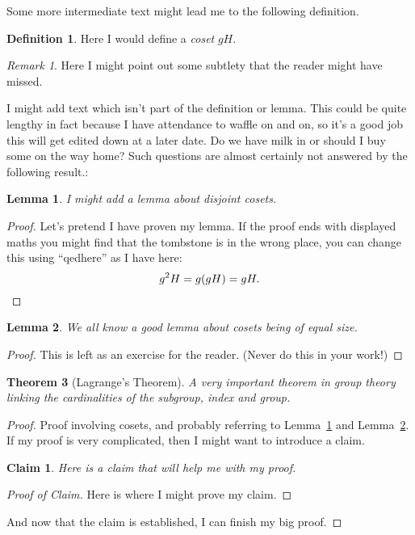 \documentclass[a4paper,11pt]{article}
\theoremstyle{plain} %
\newtheorem{thm}{Theorem}[section]
\newtheorem{lem}[thm]{Lemma}
\newtheorem*{claim}{Claim}
\theoremstyle{definition} %
\newtheorem{defn}{Definition}[section]
\theoremstyle{remark} %
\newtheorem*{rem}{Remark}
\begin{document}
Some more intermediate text might lead me to the following definition.
\begin{defn}
	Here I would define a \emph{coset} $gH$.
\end{defn}
\begin{rem}
	Here I might point out some subtlety that the reader might have missed.
\end{rem}

I might add text which isn't part of the definition or lemma. This could be quite lengthy in fact because I have attendance to waffle on and on, so it's a good job this will get edited down at a later date. Do we have milk in or should I buy some on the way home? Such questions are almost certainly not answered by the following result.:

\begin{lem}\label{lem:LeftCosetsDisjoint}
	I might add a lemma about disjoint cosets.
\end{lem}

\begin{proof}
	Let's pretend I have proven my lemma.
	If the proof ends with displayed maths you might find that the tombstone is in the wrong place, you can change this using ``qedhere'' as I have here:
	\begin{equation}
		g^2H= g(gH)= gH.  \qedhere
	\end{equation}
\end{proof}

\begin{lem}\label{lem:SizeOfLeftCoset}
	We all know a good lemma about cosets being of equal size.
\end{lem}

\begin{proof}
	This is left as an exercise for the reader. (Never do this in your work!)
\end{proof}

\begin{thm}[Lagrange's Theorem] %
\label{thm:Lagrange}
	A very important theorem in group theory linking the cardinalities of the subgroup, index and group.
\end{thm}

\begin{proof}
	Proof involving cosets, and probably referring to Lemma~\ref{lem:LeftCosetsDisjoint} and Lemma~\ref{lem:SizeOfLeftCoset}.
	If my proof is very complicated, then I might want to introduce a claim.
	\begin{claim}
		Here is a claim that will help me with my proof.
	\end{claim}
	\begin{proof}[Proof of Claim] %
		Here is where I might prove my claim.
	\end{proof}
	And now that the claim is established, I can finish my big proof.
\end{proof}
\end{document}
